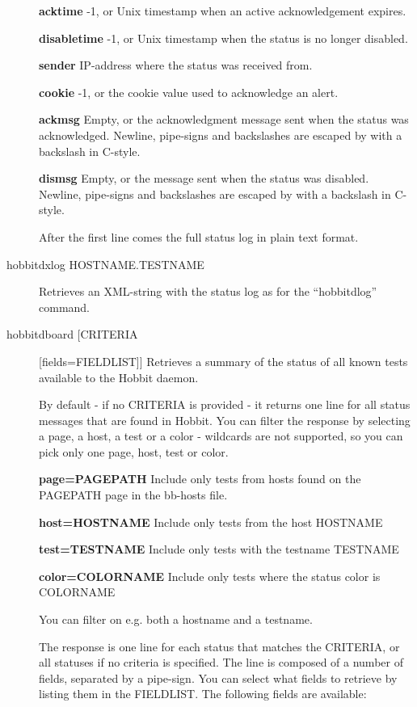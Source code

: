 \begin{description}
 \textbf{acktime}
 -1, or Unix timestamp when an active acknowledgement expires. 


 \textbf{disabletime}
 -1, or Unix timestamp when the status is no longer disabled. 


 \textbf{sender}
 IP-address where the status was received from. 


 \textbf{cookie}
 -1, or the cookie value used to acknowledge an alert. 


 \textbf{ackmsg}
 Empty, or the acknowledgment message sent when the status was
 acknowledged. Newline, pipe-signs and backslashes are escaped by with
 a backslash in C-style. 



 \textbf{dismsg}
 Empty, or the message sent when the status was disabled. Newline,
 pipe-signs and backslashes are escaped by with a backslash in
 C-style. 



  After the first line comes the full status log in plain text format. 


 

\item[hobbitdxlog HOSTNAME.TESTNAME] Retrieves an XML-string with the
  status log as for the ``hobbitdlog'' command. 


\item[hobbitdboard [CRITERIA] [fields=FIELDLIST]] Retrieves a summary
  of the status of all known tests available to the Hobbit daemon. 


  By default - if no CRITERIA is provided - it returns one line for
  all status messages that are found in Hobbit. You can filter the
  response by selecting a page, a host, a test or a color - wildcards
  are not supported, so you can pick only one page, host, test or
  color. 

 \textbf{page=PAGEPATH}
 Include only tests from hosts found on the PAGEPATH page in the bb-hosts file. 


 \textbf{host=HOSTNAME}
 Include only tests from the host HOSTNAME 


 \textbf{test=TESTNAME}
 Include only tests with the testname TESTNAME 


 \textbf{color=COLORNAME}
 Include only tests where the status color is COLORNAME 


  You can filter on e.g. both a hostname and a testname. 


  The response is one line for each status that matches the CRITERIA,
  or all statuses if no criteria is specified. The line is composed of
  a number of fields, separated by a pipe-sign. You can select what
  fields to retrieve by listing them in the FIELDLIST. The following
  fields are available: 



\end{description}
